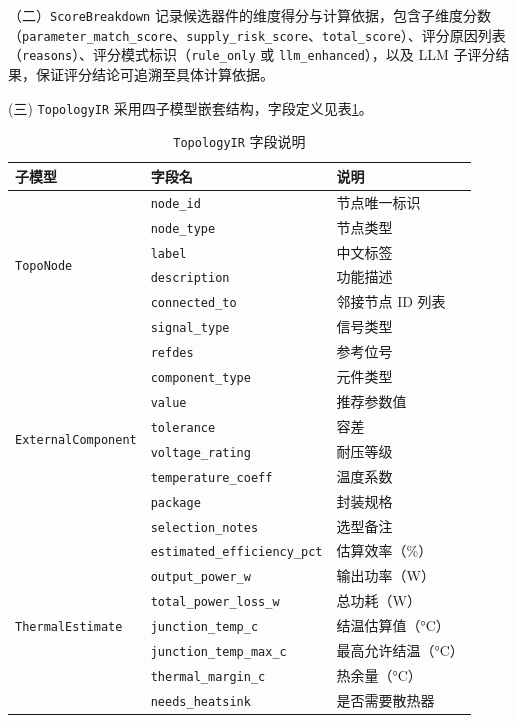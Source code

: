 （二）\texttt{ScoreBreakdown} 记录候选器件的维度得分与计算依据，包含子维度分数（\texttt{parameter\_match\_score}、\texttt{supply\_risk\_score}、\texttt{total\_score}）、评分原因列表（\texttt{reasons}）、评分模式标识（\texttt{rule\_only} 或 \texttt{llm\_enhanced}），以及 LLM 子评分结果，保证评分结论可追溯至具体计算依据。

(三) \texttt{TopologyIR} 采用四子模型嵌套结构，字段定义见表\ref{tab:topoir}。
\begin{table}[h]
\centering
\caption{\texttt{TopologyIR} 字段说明}
\label{tab:topoir}
\footnotesize
\setlength{\tabcolsep}{4pt}
\renewcommand{\arraystretch}{0.9}
\begin{tabularx}{\textwidth}{p{3.2cm}p{4.5cm}X}
\toprule
\textbf{子模型} & \textbf{字段名} & \textbf{说明} \\
\midrule
\multirow{6}{*}{\texttt{TopoNode}}
& \texttt{node\_id} & 节点唯一标识 \\
& \texttt{node\_type} & 节点类型 \\
& \texttt{label} & 中文标签 \\
& \texttt{description} & 功能描述 \\
& \texttt{connected\_to} & 邻接节点 ID 列表 \\
& \texttt{signal\_type} & 信号类型 \\
\midrule

\multirow{8}{*}{\texttt{ExternalComponent}}
& \texttt{refdes} & 参考位号 \\
& \texttt{component\_type} & 元件类型 \\
& \texttt{value} & 推荐参数值 \\
& \texttt{tolerance} & 容差 \\
& \texttt{voltage\_rating} & 耐压等级 \\
& \texttt{temperature\_coeff} & 温度系数 \\
& \texttt{package} & 封装规格 \\
& \texttt{selection\_notes} & 选型备注 \\
\midrule

\multirow{7}{*}{\texttt{ThermalEstimate}}
& \texttt{estimated\_efficiency\_pct} & 估算效率（\%） \\
& \texttt{output\_power\_w} & 输出功率（W） \\
& \texttt{total\_power\_loss\_w} & 总功耗（W） \\
& \texttt{junction\_temp\_c} & 结温估算值（°C） \\
& \texttt{junction\_temp\_max\_c} & 最高允许结温（°C） \\
& \texttt{thermal\_margin\_c} & 热余量（°C） \\
& \texttt{needs\_heatsink} & 是否需要散热器 \\
\bottomrule
\end{tabularx}
\end{table}

